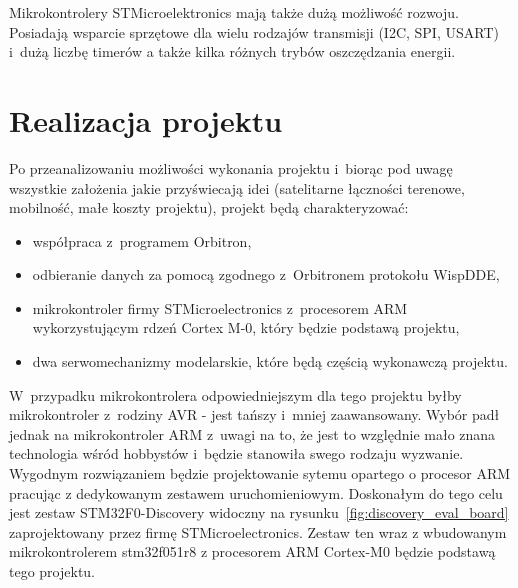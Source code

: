 \documentclass[eng,oneside]{mgr}
\begin{document}
			Mikrokontrolery STMicroelektronics mają także dużą możliwość rozwoju. Posiadają wsparcie sprzętowe dla wielu rodzajów transmisji (I2C, SPI, USART) i~dużą liczbę timerów a także kilka różnych trybów oszczędzania energii.

	\chapter{Realizacja projektu}
	\label{sec:project_realization}
	Po przeanalizowaniu możliwości wykonania projektu i~biorąc pod uwagę wszystkie założenia jakie przyświecają idei (satelitarne łączności terenowe, mobilność, małe koszty projektu), projekt będą charakteryzować:
	\begin{itemize}
		\item współpraca z~programem Orbitron,
		\item odbieranie danych za pomocą zgodnego z~Orbitronem protokołu WispDDE,
		\item mikrokontroler firmy STMicroelectronics z~procesorem ARM wykorzystującym rdzeń Cortex M-0, który będzie podstawą projektu,
		\item dwa serwomechanizmy modelarskie, które będą częścią wykonawczą projektu.
	\end{itemize}

	W~przypadku mikrokontrolera odpowiedniejszym dla tego projektu byłby mikrokontroler z~rodziny AVR - jest tańszy i~mniej zaawansowany. Wybór padł jednak na mikrokontroler ARM z~uwagi na to, że jest to względnie mało znana technologia wśród hobbystów i~będzie stanowiła swego rodzaju wyzwanie. Wygodnym rozwiązaniem będzie projektowanie sytemu opartego o procesor ARM pracując z dedykowanym zestawem uruchomieniowym. Doskonałym do tego celu jest zestaw STM32F0-Discovery widoczny na rysunku~\ref{fig:discovery_eval_board} zaprojektowany przez firmę STMicroelectronics. Zestaw ten wraz z wbudowanym mikrokontrolerem stm32f051r8 z procesorem ARM Cortex-M0 będzie podstawą tego projektu.
	
\end{document}
